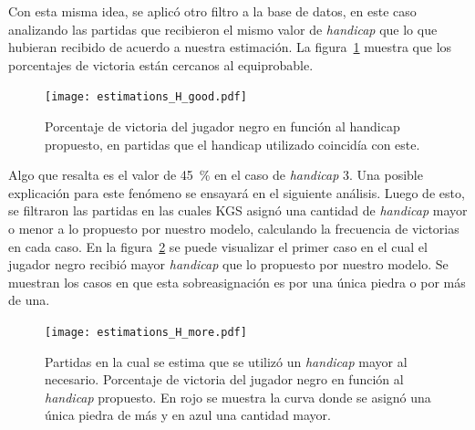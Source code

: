 \documentclass[11pt,twoside, spanish]{report} %
\begin{document}
Con esta misma idea, se aplic\'o otro filtro a la base de datos, en este caso analizando las partidas que recibieron el mismo valor de \textit{handicap} que lo que hubieran recibido de acuerdo a nuestra estimaci\'on.
La figura~\ref{fig:handicap_porcentaje_bien} muestra que los porcentajes de victoria est\'an cercanos al equiprobable.

\begin{figure}[H]
    \centering
    \texttt{[image: estimations\_H\_good.pdf]}
    \caption{Porcentaje de victoria del jugador negro en funci\'on al handicap propuesto, en partidas que el handicap utilizado coincid\'ia con este.}
    \label{fig:handicap_porcentaje_bien}
\end{figure}


Algo que resalta es el valor de \SI{45}{\percent} en el caso de \textit{handicap} 3.
Una posible explicaci\'on para este fen\'omeno se ensayar\'a  en el siguiente an\'alisis.
Luego de esto, se filtraron las partidas en las cuales KGS asign\'o una cantidad de \textit{handicap} mayor o menor a lo propuesto por nuestro modelo, calculando la frecuencia de victorias en cada caso.
En la figura~\ref{fig:handicap_porcentaje_de_mas} se puede visualizar el primer caso en el cual el jugador negro recibi\'o mayor \textit{handicap} que lo propuesto por nuestro modelo. 
Se muestran los casos en que esta sobreasignaci\'on es por una \'unica piedra o por m\'as de una.


\begin{figure}[H]
    \centering
    \texttt{[image: estimations\_H\_more.pdf]}
    \caption{Partidas en la cual se estima que se utiliz\'o un \textit{handicap} mayor al necesario. Porcentaje de victoria del jugador negro en funci\'on al \textit{handicap} propuesto. En rojo se muestra la curva donde se asign\'o  una \'unica piedra de m\'as y en azul una cantidad mayor. }
    \label{fig:handicap_porcentaje_de_mas}
\end{figure}
\end{document}
